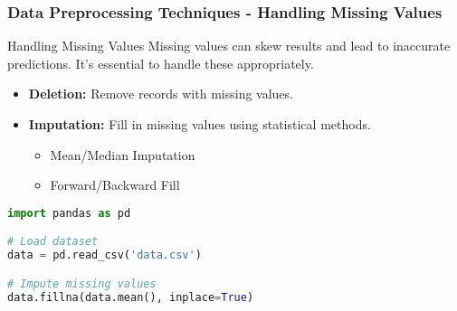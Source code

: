 \documentclass{beamer}
\begin{document}
\begin{frame}[fragile]
    \frametitle{Data Preprocessing Techniques - Handling Missing Values}
    \begin{block}{Handling Missing Values}
        Missing values can skew results and lead to inaccurate predictions. It's essential to handle these appropriately.
    \end{block}

    \begin{itemize}
        \item \textbf{Deletion:} Remove records with missing values.
        \item \textbf{Imputation:} Fill in missing values using statistical methods.
        \begin{itemize}
            \item Mean/Median Imputation
            \item Forward/Backward Fill
        \end{itemize}
    \end{itemize}
    
    \begin{lstlisting}[language=Python]
import pandas as pd

# Load dataset
data = pd.read_csv('data.csv')

# Impute missing values
data.fillna(data.mean(), inplace=True)
    \end{lstlisting}
\end{frame}
\end{document}
